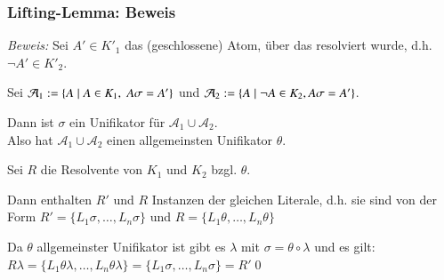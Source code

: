 \documentclass[onlymath]{beamer}
\begin{document}
\begin{frame}\frametitle{Lifting-Lemma: Beweis}


\emph{Beweis:} Sei $A'\in K'_1$ das (geschlossene) Atom, über das resolviert wurde, d.h. $\neg A'\in K'_2$.\smallskip\pause

Sei $\mathcal{A}_1\mathrel{:=}\{A\mid A\in K_1,\;A\sigma=A'\}$ und $\mathcal{A}_2\mathrel{:=}\{A\mid \neg A\in K_2, A\sigma=A'\}$.\smallskip\pause

Dann ist $\sigma$ ein Unifikator für $\mathcal{A}_1\cup\mathcal{A}_2$.\\ Also hat $\mathcal{A}_1\cup\mathcal{A}_2$ einen allgemeinsten Unifikator $\theta$.\smallskip\pause

Sei $R$ die Resolvente von $K_1$ und $K_2$ bzgl. $\theta$.\smallskip\pause

Dann enthalten $R'$ und $R$ Instanzen der gleichen Literale, d.h. sie sind von der Form
$R'=\{L_1\sigma,\ldots,L_n\sigma\}$ und $R=\{L_1\theta,\ldots,L_n\theta\}$\smallskip\pause

Da $\theta$ allgemeinster Unifikator ist gibt es $\lambda$ mit $\sigma=\theta\circ\lambda$
und es gilt: $R\lambda=\{L_1\theta\lambda,\ldots,L_n\theta\lambda\}=\{L_1\sigma,\ldots,L_n\sigma\}=R'$\qed


\end{frame}
\end{document}
